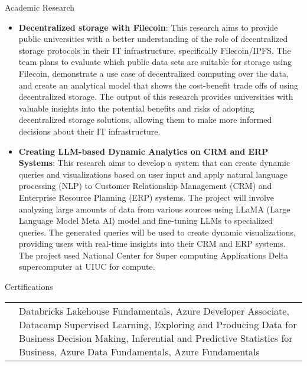 \documentclass{resume} %
\makeatletter
\newcommand{\entry}[2]{#1 & #2 \tabularnewline} %
\newcommand{\tableEnv}[2]{%
    \begin{rSection}{#1} %
        \begin{adjustwidth}{0.0in}{0.1in} %
            \begin{tabularx}{\linewidth}{@{} >{\bfseries}l @{\hspace{6ex}} X @{}}
                #2 %
            \end{tabularx}
        \end{adjustwidth}
    \end{rSection}
}
\makeatother
\begin{document}
    \begin{rSection}{Academic Research}
        \begin{itemize}
            \item \textbf{Decentralized storage with Filecoin}: This research aims to provide public universities with a better understanding of the role of decentralized storage protocols in their IT infrastructure, specifically Filecoin/IPFS. The team plans to evaluate which public data sets are suitable for storage using Filecoin, demonstrate a use case of decentralized computing over the data, and create an analytical model that shows the cost-benefit trade offs of using decentralized storage. The output of this research provides universities with valuable insights into the potential benefits and risks of adopting decentralized storage solutions, allowing them to make more informed decisions about their IT infrastructure.
            \item \textbf{Creating LLM-based Dynamic Analytics on CRM and ERP Systems}: This research aims to develop a system that can create dynamic queries and visualizations based on user input and apply natural language processing (NLP) to Customer
            Relationship Management (CRM) and Enterprise Resource Planning (ERP) systems. The project 
            will involve analyzing large amounts of data from various sources using LLaMA (Large 
            Language Model Meta AI) model and fine-tuning LLMs to specialized queries. The generated 
            queries will be used to create dynamic visualizations, providing users with real-time insights 
            into their CRM and ERP systems. The project used National Center for Super computing Applications Delta supercomputer at UIUC for compute.
        \end{itemize}
    \end{rSection}
    
    
    \tableEnv{Certifications}{
        \entry{}{Databricks Lakehouse Fundamentals, Azure Developer Associate, Datacamp Supervised Learning, Exploring and Producing Data for Business Decision Making, Inferential and Predictive Statistics for Business, Azure Data Fundamentals, Azure Fundamentals}
    }
    
    
    
\end{document}
